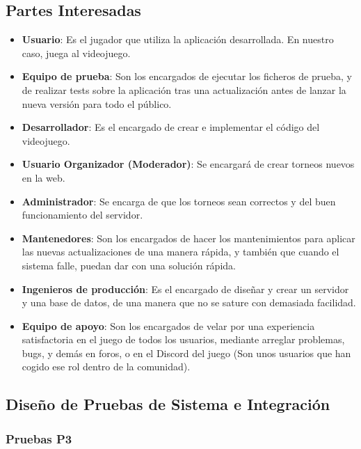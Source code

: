 \documentclass{article}
\begin{document}
\subsection{Partes Interesadas}

\begin{itemize}
    \item \textbf{Usuario}: Es el jugador que utiliza la aplicación desarrollada. En nuestro caso, juega al videojuego.
    \item \textbf{Equipo de prueba}: Son los encargados de ejecutar los ficheros de prueba, y de realizar tests sobre
    la aplicación tras una actualización antes de lanzar la nueva versión para todo el público.
    \item \textbf{Desarrollador}: Es el encargado de crear e implementar el código del videojuego.
    \item \textbf{Usuario Organizador (Moderador)}: Se encargará de crear torneos nuevos en la web.
    \item \textbf{Administrador}: Se encarga de que los torneos sean correctos y del buen funcionamiento del servidor.
    \item \textbf{Mantenedores}: Son los encargados de hacer los mantenimientos para aplicar las nuevas actualizaciones de una manera rápida, y también que cuando el sistema falle, puedan dar con una solución rápida.
    \item \textbf{Ingenieros de producción}: Es el encargado de diseñar y crear un servidor y una base de datos, de una manera que no se sature con demasiada facilidad.
    \item \textbf{Equipo de apoyo}: Son los encargados de velar por una experiencia satisfactoria en el juego de todos los usuarios, mediante arreglar problemas, bugs, y demás en foros, o en el Discord del juego (Son unos usuarios que han cogido ese rol dentro de la comunidad).
\end{itemize}

\subsection{Diseño de Pruebas de Sistema e Integración}

\subsubsection{Pruebas P3}
\end{document}

